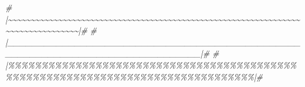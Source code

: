 \documentclass[
]{article}
\newenvironment{Shaded}{\begin{snugshade}}{\end{snugshade}}
\newcommand{\CommentTok}[1]{\textcolor[rgb]{0.56,0.35,0.01}{\textit{#1}}}
\begin{document}
\begin{Shaded}
\begin{Highlighting}[]
\CommentTok{\# |\textasciitilde{}\textasciitilde{}\textasciitilde{}\textasciitilde{}\textasciitilde{}\textasciitilde{}\textasciitilde{}\textasciitilde{}\textasciitilde{}\textasciitilde{}\textasciitilde{}\textasciitilde{}\textasciitilde{}\textasciitilde{}\textasciitilde{}\textasciitilde{}\textasciitilde{}\textasciitilde{}\textasciitilde{}\textasciitilde{}\textasciitilde{}\textasciitilde{}\textasciitilde{}\textasciitilde{}\textasciitilde{}\textasciitilde{}\textasciitilde{}\textasciitilde{}\textasciitilde{}\textasciitilde{}\textasciitilde{}\textasciitilde{}\textasciitilde{}\textasciitilde{}\textasciitilde{}\textasciitilde{}\textasciitilde{}\textasciitilde{}\textasciitilde{}\textasciitilde{}\textasciitilde{}\textasciitilde{}\textasciitilde{}\textasciitilde{}\textasciitilde{}\textasciitilde{}\textasciitilde{}\textasciitilde{}\textasciitilde{}\textasciitilde{}\textasciitilde{}\textasciitilde{}\textasciitilde{}\textasciitilde{}\textasciitilde{}\textasciitilde{}\textasciitilde{}\textasciitilde{}\textasciitilde{}\textasciitilde{}\textasciitilde{}\textasciitilde{}\textasciitilde{}\textasciitilde{}\textasciitilde{}\textasciitilde{}\textasciitilde{}\textasciitilde{}\textasciitilde{}\textasciitilde{}\textasciitilde{}\textasciitilde{}\textasciitilde{}\textasciitilde{}\textasciitilde{}\textasciitilde{}\textasciitilde{}\textasciitilde{}\textasciitilde{}\textasciitilde{}|\#}
\CommentTok{\# |\_\_\_\_\_\_\_\_\_\_\_\_\_\_\_\_\_\_\_\_\_\_\_\_\_\_\_\_\_\_\_\_\_\_\_\_\_\_\_\_\_\_\_\_\_\_\_\_\_\_\_\_\_\_\_\_\_\_\_\_\_\_\_\_\_\_\_\_\_\_\_\_\_\_\_\_\_\_\_\_|\#}
\CommentTok{\# |\%\%\%\%\%\%\%\%\%\%\%\%\%\%\%\%\%\%\%\%\%\%\%\%\%\%\%\%\%\%\%\%\%\%\%\%\%\%\%\%\%\%\%\%\%\%\%\%\%\%\%\%\%\%\%\%\%\%\%\%\%\%\%\%\%\%\%\%\%\%\%\%\%\%\%\%\%\%\%\%|\#}
\end{Highlighting}
\end{Shaded}
\end{document}
